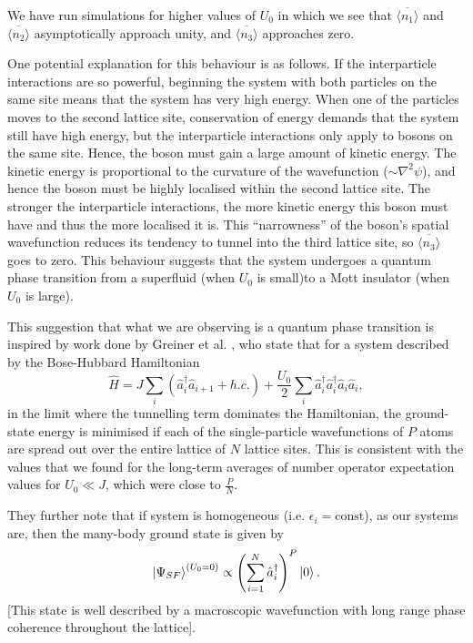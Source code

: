\documentclass[a4paper, 10pt]{article}
\theoremstyle{plain}
\begin{document}
We have run simulations for higher values of $U_{0}$ in which we see that
$\overline{\langle n_{1} \rangle}$ and $\overline{\langle n_{2} \rangle}$
asymptotically approach unity, and $\overline{\langle n_{3} \rangle}$ approaches
zero.

One potential explanation for this behaviour is as follows. If the interparticle
interactions are so powerful, beginning the system with both particles on
the same site means that the system has very high energy. When one of the
particles moves to the second lattice site, conservation of energy demands
that the system still have high energy, but the interparticle interactions
only apply to bosons on the same site. Hence, the boson must gain a large
amount of kinetic energy. The kinetic energy is proportional to the
curvature of the wavefunction ($\sim \nabla^2\psi$), and hence the boson must be
highly localised within the second lattice site. The stronger the interparticle
interactions, the more kinetic energy this boson must have and thus the more
localised it is. This ``narrowness'' of the boson's spatial wavefunction
reduces its tendency to tunnel into the third lattice site, so
$\overline{\langle n_{3} \rangle}$ goes to zero. This behaviour suggests
that the system undergoes a quantum phase transition from a superfluid (when
$U_{0}$ is small)to a Mott insulator (when $U_{0}$ is large).

This suggestion that what we are observing is a quantum phase transition is
inspired by work done by Greiner et al. \cite{Greiner2002},
who state that for a system described by the Bose-Hubbard Hamiltonian
\begin{equation*}
    \hat{H}
    =
    J \sum_{i}{(\hat{a}^\dagger_{i}\hat{a}_{i+1}+h.c.)} +
    \frac{U_{0}}{2}
    \sum_{i}{\hat{a}^{\dagger}_{i} \hat{a}^{\dagger}_{i} \hat{a}_{i} \hat{a}_{i}},
\end{equation*}
in the limit where the tunnelling term dominates the Hamiltonian, the
ground-state energy is minimised if each of the single-particle wavefunctions of
$P$ atoms are spread out over the entire lattice of $N$ lattice sites. This is
consistent with the values that we found for the long-term averages of number
operator expectation values for $U_{0} \ll J$, which were close to $\frac{P}{N}$.

They further note that if system is homogeneous (i.e. $\epsilon_{i} =
\text{const}$), as our systems are, then the many-body ground state is given by
\begin{equation}
    \ket{\Psi_{SF}}^{ \left ( U_{0} = 0 \right)}
    \propto
    \left ( \sum_{i=1}^{N}{\hat{a}_{i}^{\dagger}} \right )^{P}
    \ket{0}.
\end{equation}
[This state is well described by a macroscopic wavefunction with long range
phase coherence throughout the lattice].
\end{document}
